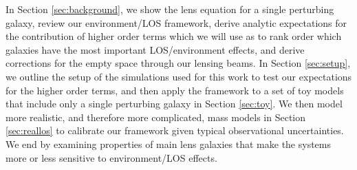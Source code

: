 In Section \ref{sec:background}, we show the lens equation for a single perturbing galaxy, review our environment/LOS framework, derive analytic expectations for the contribution of higher order terms which we will use as to rank order which galaxies have the most important LOS/environment effects, and derive corrections for the empty space through our lensing beams. In Section \ref{sec:setup}, we outline the setup of the simulations used for this work to test our expectations for the higher order terms, and then apply the framework to a set of toy models that include only a single perturbing galaxy in Section \ref{sec:toy}. We then model more realistic, and therefore more complicated, mass models in Section \ref{sec:reallos} to calibrate our framework given typical observational uncertainties. We end by examining properties of main lens galaxies that make the systems more or less sensitive to environment/LOS effects.